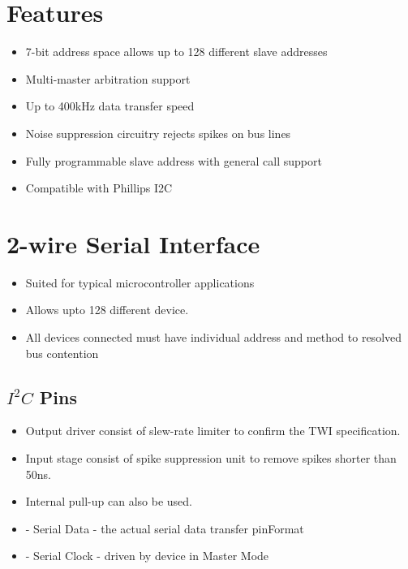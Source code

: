 


% 

\section{Features}
\begin{itemize}
    \item 7-bit address space allows up to 128 different slave addresses
    \item Multi-master arbitration support
    \item Up to 400kHz data transfer speed
    \item Noise suppression circuitry rejects spikes on bus lines
    \item Fully programmable slave address with general call support
    \item Compatible with Phillips I­2C
\end{itemize}
\section{2-wire Serial Interface}
\begin{itemize}
    \item Suited for typical microcontroller applications
    \item Allows upto  128 different device.
    \item All devices connected must have individual address and method to resolved bus contention
\end{itemize}

\subsection{\texorpdfstring{$I^2C$}{} Pins}
\begin{itemize}
    \item Output driver consist of slew-rate limiter to confirm the TWI specification.
    \item Input stage consist of spike suppression unit to remove spikes shorter than 50ns.
    \item Internal pull-up can also be used.
    \item {} - Serial Data - the actual serial data transfer pinFormat
    \item {} - Serial Clock - driven by device in Master Mode
\end{itemize}

